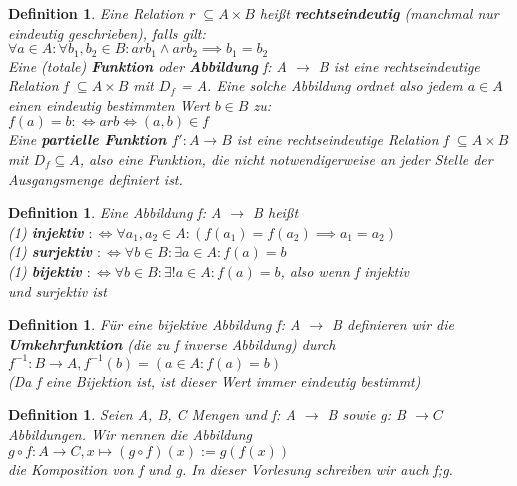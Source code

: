 \documentclass[12pt,german,a4]{article}
\begin{document}
\newtheorem{defFunk}[defRel]{Definition}
\begin{defFunk}
Eine Relation r $\subseteq A \times B$ heißt {\bf rechtseindeutig} (manchmal nur eindeutig geschrieben), falls gilt:\\
$\forall a \in A: \forall b_{1}, b_{2} \in B: a r b_{1} \wedge a r b_{2} \implies b_{1} = b_{2}$\\
Eine (totale) {\bf Funktion} oder {\bf Abbildung} f: A $\rightarrow$ B ist eine rechtseindeutige Relation f $\subseteq A \times B$ mit $D_{f}$ = A. Eine solche Abbildung ordnet also jedem $a \in A$ einen eindeutig bestimmten Wert $b \in B$ zu:\\
$f(a) = b :\Leftrightarrow a r b \Leftrightarrow (a, b) \in f$\\
Eine {\bf partielle Funktion} $f': A \rightarrow B$ ist eine rechtseindeutige Relation f $\subseteq A \times B$ mit $D_{f} \subseteq A$, also eine Funktion, die nicht notwendigerweise an jeder Stelle der Ausgangsmenge definiert ist.
\end{defFunk}

\pagebreak

\newtheorem{defFunkProps}[defRel]{Definition}
\begin{defFunkProps}
Eine Abbildung f: A $\rightarrow$ B heißt\\
(1) {\bf injektiv} $:\Leftrightarrow \forall a_{1}, a_{2} \in A: (f(a_{1}) = f(a_{2}) \implies a_{1} = a_{2})$\\
(1) {\bf surjektiv} $:\Leftrightarrow \forall b \in B: \exists a \in A: f(a) = b$\\
(1) {\bf bijektiv} $:\Leftrightarrow \forall b \in B: \exists! a \in A: f(a) = b$, also wenn f injektiv\\
 \noindent\hspace*{6mm}und surjektiv ist
\end{defFunkProps}

\newtheorem{defRev}[defRel]{Definition}
\begin{defRev}
Für eine bijektive Abbildung f: A $\rightarrow$ B definieren wir die {\bf Umkehrfunktion} (die zu f inverse Abbildung) durch\\
$f^{-1}: B \rightarrow A, f^{-1}(b) = (a \in A : f(a) = b)$\\
(Da f eine Bijektion ist, ist dieser Wert immer eindeutig bestimmt)
\end{defRev}

\newtheorem{defKomp}[defRel]{Definition}
\begin{defKomp}
Seien A, B, C Mengen und f: A $\rightarrow$ B sowie g: B $\rightarrow C$ Abbildungen. Wir nennen die Abbildung\\
$g \circ f: A \rightarrow C, x \mapsto (g \circ f)(x) := g(f(x))$\\
die Komposition von f und g. In dieser Vorlesung schreiben wir auch f;g.
\end{defKomp}
\end{document}

